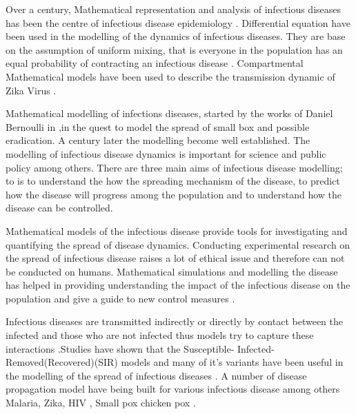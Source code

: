 Over a  century, Mathematical representation and analysis of infectious diseases has been the centre of  infectious disease epidemiology \citep{b2005}. Differential equation have been used in the modelling of the dynamics of infectious diseases. They are base on the assumption of uniform mixing, that is everyone in the population has an equal probability of contracting an infectious disease \citep{kaplan2002emergency}.
Compartmental Mathematical models have been used to describe the transmission dynamic of Zika Virus \citep{gao2016}.

Mathematical modelling of infections diseases, started by the works of Daniel Bernoulli in \cite{bernoulli1760essai},in the quest to model the spread of small box and possible eradication. A century later the modelling become well established. The modelling of infectious disease dynamics is important for science and public policy among others. There are three main aims of infectious disease modelling; to is to understand the how the spreading mechanism of the disease, to  predict how the disease will progress among the population and to understand how the disease can be controlled.


Mathematical models of the infectious disease provide tools for investigating and quantifying the spread of disease dynamics.
Conducting experimental research on the spread of infectious disease raises a lot of ethical issue and therefore can not be conducted on humans. Mathematical simulations and modelling the disease has helped in providing understanding the impact of the infectious disease on the population and give a guide to new control measures \citep{ming2016stochastic}.

Infectious diseases are transmitted indirectly  or directly by contact between the infected and those who are not infected thus models try to capture these interactions \citep{sat}.Studies have shown that the 
Susceptible- Infected- Removed(Recovered)(SIR) models and many of it's
variants have been useful in the modelling of the spread of infectious diseases \citep{li}.  A number of disease propagation model have being built for various infectious disease among others Malaria, Zika, HIV , Small pox chicken pox \citep{ding2016mathematical}.

